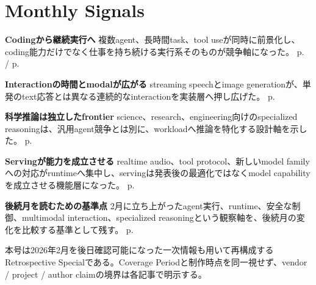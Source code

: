 \section*{Monthly Signals}
\smallskip
\noindent \textbf{Codingから継続実行へ} 複数agent、長時間task、tool useが同時に前景化し、coding能力だけでなく仕事を持ち続ける実行系そのものが競争軸になった。 \hfill{\footnotesize p.~\pageref{pkg:agentic-engineering-frontier} / p.~\pageref{pkg:open-model-agent-stack}}
\par
\smallskip
\noindent \textbf{Interactionの時間とmodalが広がる} streaming speechとimage generationが、単発のtext応答とは異なる連続的なinteractionを実装層へ押し広げた。 \hfill{\footnotesize p.~\pageref{pkg:realtime-multimodal-interaction}}
\par
\smallskip
\noindent \textbf{科学推論は独立したfrontier} science、research、engineering向けのspecialized reasoningは、汎用agent競争とは別に、workloadへ推論を特化する設計軸を示した。 \hfill{\footnotesize p.~\pageref{pkg:specialized-reasoning-science}}
\par
\smallskip
\noindent \textbf{Servingが能力を成立させる} realtime audio、tool protocol、新しいmodel familyへの対応がruntimeへ集中し、servingは発表後の最適化ではなくmodel capabilityを成立させる機能層になった。 \hfill{\footnotesize p.~\pageref{pkg:serving-stack-catches-up}}
\par
\smallskip
\noindent \textbf{後続月を読むための基準点} 2月に立ち上がったagent実行、runtime、安全な制御、multimodal interaction、specialized reasoningという観察軸を、後続月の変化を比較する基準として残す。 \hfill{\footnotesize p.~\pageref{pkg:closing-synthesis}}
\par
\medskip
\begin{claimboundary}
本号は2026年2月を後日確認可能になった一次情報も用いて再構成するRetrospective Specialである。Coverage Periodと制作時点を同一視せず、vendor / project / author claimの境界は各記事で明示する。
\end{claimboundary}
\medskip
\tableofcontents

